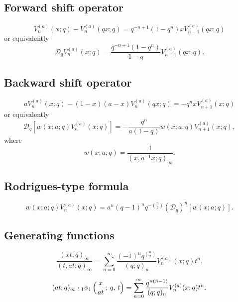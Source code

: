\documentclass[envcountchap,graybox]{svmono}
\newcommand{\qhyp}[5]{\mbox{}_{#1}{\phi}_{#2}
\left(\genfrac{}{}{0pt}{}{#3}{#4}\,;\,q,\,#5\right)}
\begin{document}
\subsection*{Forward shift operator}
\begin{equation}
\label{shift1AlSalamCarlitzII-I}
V_n^{(a)}(x;q)-V_n^{(a)}(qx;q)=q^{-n+1}(1-q^n)xV_{n-1}^{(a)}(qx;q)
\end{equation}
or equivalently
\begin{equation}
\label{shift1AlSalamCarlitzII-II}
\mathcal{D}_qV_n^{(a)}(x;q)=\frac{q^{-n+1}(1-q^n)}{1-q}
V_{n-1}^{(a)}(qx;q).
\end{equation}

\subsection*{Backward shift operator}
\begin{equation}
\label{shift2AlSalamCarlitzII-I}
aV_n^{(a)}(x;q)-(1-x)(a-x)V_n^{(a)}(qx;q)=-q^nxV_{n+1}^{(a)}(x;q)
\end{equation}
or equivalently
\begin{equation}
\label{shift2AlSalamCarlitzII-II}
\mathcal{D}_q\left[w(x;a;q)V_n^{(a)}(x;q)\right]
=-\frac{q^n}{a(1-q)}w(x;a;q)V_{n+1}^{(a)}(x;q),
\end{equation}
where
$$w(x;a;q)=\frac{1}{(x,a^{-1}x;q)_{\infty}}.$$

\newpage

\subsection*{Rodrigues-type formula}
\begin{equation}
\label{RodAlSalamCarlitzII}
w(x;a;q)V_n^{(a)}(x;q)=a^n(q-1)^nq^{-\binom{n}{2}}
\left(\mathcal{D}_q\right)^n\left[w(x;a;q)\right].
\end{equation}

\subsection*{Generating functions}
\begin{equation}
\label{GenAlSalmCarlitzII1}
\frac{(xt;q)_{\infty}}{(t,at;q)_{\infty}}=\sum_{n=0}^{\infty}
\frac{(-1)^nq^{\binom{n}{2}}}{(q;q)_n}V_n^{(a)}(x;q)t^n.
\end{equation}

\begin{equation}
\label{GenAlSalamCarlitzII2}
(at;q)_{\infty}\cdot\qhyp{1}{1}{x}{at}{t}=\sum_{n=0}^{\infty}
\frac{q^{n(n-1)}}{(q;q)_n}V_n^{(a)}(x;q)t^n.
\end{equation}
\end{document}
